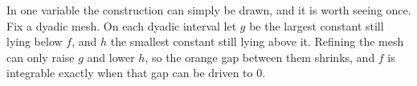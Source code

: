
In one variable the construction can simply be drawn, and it is worth seeing once. Fix a dyadic
mesh. On each dyadic interval let $g$ be the largest constant still lying below $f$, and $h$ the
smallest constant still lying above it. Refining the mesh can only raise $g$ and lower $h$, so the
orange gap between them shrinks, and $f$ is integrable exactly when that gap can be driven to $0$.

